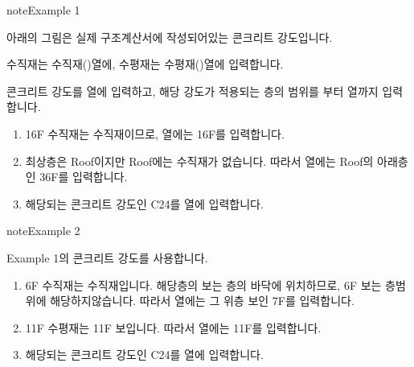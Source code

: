 \documentclass[a4paper,11pt,korean,openany,oneside]{sphinxmanual}
\begin{document}
\begin{sphinxadmonition}{note}{Example 1}

\sphinxAtStartPar
아래의 그림은 실제 구조계산서에 작성되어있는 콘크리트 강도입니다.

\begin{figure}[H]
\centering

\noindent{}
\end{figure}

\sphinxAtStartPar
수직재는 수직재()열에, 수평재는 수평재()열에 입력합니다.

\sphinxAtStartPar
콘크리트 강도를 열에 입력하고, 해당 강도가 적용되는 층의 범위를 부터 열까지 입력합니다.

\begin{figure}[H]
\centering

\noindent{}
\end{figure}
\begin{enumerate}
%
\item {} 
\sphinxAtStartPar
16F 수직재는 수직재이므로, 열에는 16F를 입력합니다.

\item {} 
\sphinxAtStartPar
최상층은 Roof이지만 Roof에는 수직재가 없습니다. 따라서 열에는 Roof의 아래층인 36F를 입력합니다.

\item {} 
\sphinxAtStartPar
해당되는 콘크리트 강도인 C24를 열에 입력합니다.

\end{enumerate}
\end{sphinxadmonition}

\begin{sphinxadmonition}{note}{Example 2}

\sphinxAtStartPar
Example 1의 콘크리트 강도를 사용합니다.
\begin{enumerate}
%
\item {} 
\sphinxAtStartPar
6F 수직재는 수직재입니다. 해당층의 보는 층의 바닥에 위치하므로, 6F 보는 층범위에 해당하지않습니다.
따라서 열에는 그 위층 보인 7F를 입력합니다.

\item {} 
\sphinxAtStartPar
11F 수평재는 11F 보입니다. 따라서 열에는 11F를 입력합니다.

\item {} 
\sphinxAtStartPar
해당되는 콘크리트 강도인 C24를 열에 입력합니다.

\end{enumerate}
\end{sphinxadmonition}
\end{document}
